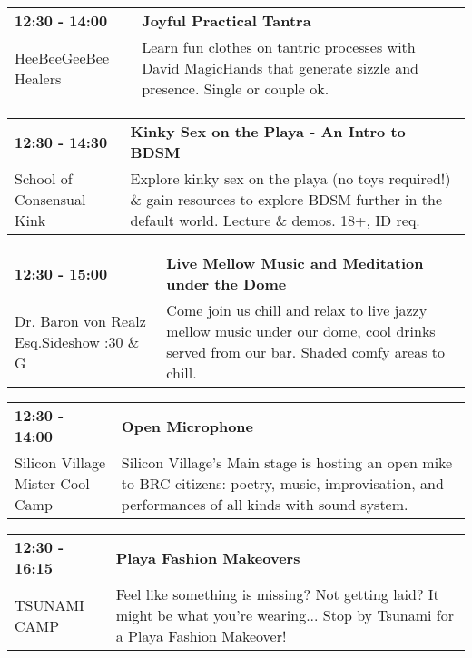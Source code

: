 \begin{tabular}{ p{1in} p{2.2in} }
    \textbf{12:30 - 14:00} & \textbf{Joyful Practical Tantra} \\
    HeeBeeGeeBee Healers \newline  & Learn fun clothes on tantric processes with David MagicHands that generate sizzle and presence. Single or couple ok. \\
    \hline 
\end{tabular}
    
\begin{tabular}{ p{1in} p{2.2in} }
    \textbf{12:30 - 14:30} & \textbf{Kinky Sex on the Playa - An Intro to BDSM} \\
    School of Consensual Kink \newline  & Explore kinky sex on the playa (no toys required!) \& gain resources to explore BDSM further in the default world. Lecture \& demos. 18+, ID req. \\
    \hline 
\end{tabular}
    
\begin{tabular}{ p{1in} p{2.2in} }
    \textbf{12:30 - 15:00} & \textbf{Live Mellow Music and Meditation under the Dome} \\
    Dr. Baron von Realz Esq.Sideshow \newline 4:30 \& G & Come join us chill and relax to live jazzy mellow music under our dome, cool drinks served from our bar. Shaded comfy areas to chill. \\
    \hline 
\end{tabular}
    
\begin{tabular}{ p{1in} p{2.2in} }
    \textbf{12:30 - 14:00} & \textbf{Open Microphone} \\
    Silicon Village \newline Mister Cool Camp & Silicon Village's Main stage is hosting an open mike to BRC citizens: poetry, music, improvisation, and performances of all kinds with sound system. \\
    \hline 
\end{tabular}
    
\begin{tabular}{ p{1in} p{2.2in} }
    \textbf{12:30 - 16:15} & \textbf{Playa Fashion Makeovers} \\
    TSUNAMI CAMP \newline  & Feel like something is missing?  Not getting laid?  It might be what you're wearing...  Stop by Tsunami for a Playa Fashion Makeover! \\
    \hline 
\end{tabular}
    
